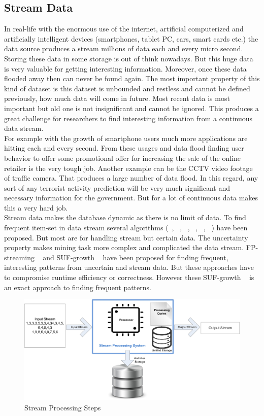 \subsection{Stream Data}
In real-life with the enormous use of the internet, artificial computerized and artificially intelligent devices (smartphones, tablet PC, cars, smart cards etc.) the data source produces a stream millions of data each and every micro second. Storing these data in some storage is out of think nowadays. But this huge data is very valuable for getting interesting information. Moreover, once these data flooded away then can never be found again. The most important property of this kind of dataset is this dataset is unbounded and restless and cannot be defined previously, how much data will come in future. Most recent data is most important but old one is not insignificant and cannot be ignored. This produces a great challenge for researchers to find interesting information from a continuous data stream.\\
For example with the growth of smartphone users much more applications are hitting each and every second. From these usages and data flood finding user behavior to offer some promotional offer for increasing the sale of the online retailer is the very tough job. Another example can be the CCTV video footage of traffic camera. That produces a large number of data flood. In this regard, any sort of any terrorist activity prediction will be very much significant and necessary information for the government. But for a lot of continuous data makes this a very hard job.\\
Stream data makes the database dynamic as there is no limit of data. To find frequent item-set in data stream several algorithms (~\cite{uncertain_01}, ~\cite{uncertain_02}, ~\cite{uncertain_03}, ~\cite{uncertain_04}, ~\cite{uncertain_05}, ~\cite{uncertain_06}) have been proposed. But most are for handling stream but certain data. The uncertainty property makes mining task more complex and complicated the data stream. FP-streaming ~\cite{suf_growth} and SUF-growth ~\cite{suf_growth} have been proposed for finding frequent, interesting patterns from uncertain and stream data. But these approaches have to compromise runtime efficiency or correctness. However these SUF-growth ~\cite{suf_growth} is an exact approach to finding frequent patterns.
\begin{figure}
\centering
  \includegraphics[width=.9\textwidth]{images/stream_data.jpg}
\caption{Stream Processing Steps}
\label{figure:stream_data}
\end{figure}


